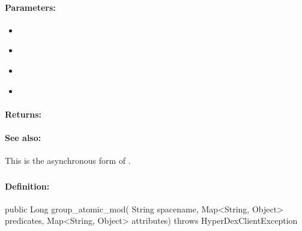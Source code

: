 \paragraph{Parameters:}
\begin{itemize}[noitemsep]
\item {}\\

\item {}\\

\item {}\\

\item {}\\

\end{itemize}

\paragraph{Returns:}


\paragraph{See also:}  This is the asynchronous form of .

\pagebreak
\subsubsection{}
\label{api:java:group_atomic_mod}


\paragraph{Definition:}
\begin{javacode}
public Long group_atomic_mod(
        String spacename,
        Map<String, Object> predicates,
        Map<String, Object> attributes) throws HyperDexClientException
\end{javacode}

